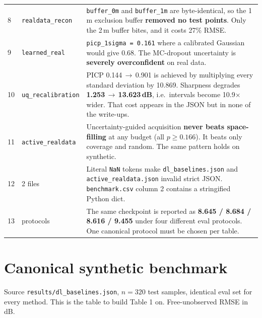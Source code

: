 \documentclass[10pt,a4paper]{article}
\newcommand{\B}[1]{\textcolor{bad}{\textbf{#1}}}
\begin{document}
\begin{longtable}{@{}p{0.5cm}p{2.6cm}p{13.4cm}@{}}
8 & \texttt{realdata\_recon} & \texttt{buffer\_0m} and \texttt{buffer\_1m} are
byte-identical, so the 1\,m exclusion buffer \B{removed no test points}. Only the 2\,m
buffer bites, and it costs 27\% RMSE. \\
9 & \texttt{learned\_real} & \texttt{picp\_1sigma = 0.161} where a calibrated Gaussian
would give 0.68. The MC-dropout uncertainty is \B{severely overconfident} on real data. \\
10 & \texttt{uq\_recalibration} & PICP 0.144\,$\to$\,0.901 is achieved by multiplying
every standard deviation by 10.869. Sharpness degrades \B{1.253\,$\to$\,13.623\,dB},
i.e.\ intervals become 10.9$\times$ wider. That cost appears in the JSON but in none of
the write-ups. \\
11 & \texttt{active\_realdata} & Uncertainty-guided acquisition \B{never beats
space-filling} at any budget (all $p\ge0.166$). It beats only coverage and random. The
same pattern holds on synthetic. \\
12 & 2 files & Literal \texttt{NaN} tokens make \texttt{dl\_baselines.json} and
\texttt{active\_realdata.json} invalid strict JSON. \texttt{benchmark.csv} column 2
contains a stringified Python dict. \\
13 & protocols & The same checkpoint is reported as \B{8.645 / 8.684 / 8.616 / 9.455}
under four different eval protocols. One canonical protocol must be chosen per table. \\
\bottomrule
\end{longtable}

\section{Canonical synthetic benchmark}

Source \texttt{results/dl\_baselines.json}, $n=320$ test samples, identical eval set for
every method. This is the table to build Table 1 on. Free-unobserved RMSE in dB.
\end{document}

